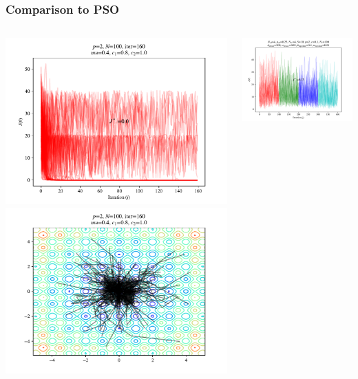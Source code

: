 \documentclass{beamer}
\begin{document}
\begin{frame}
\frametitle{Comparison to PSO}
\begin{columns}[T]
    \begin{center}
      \includegraphics[scale=0.3]{assets/pso_J}
      \includegraphics[scale=0.3]{assets/pso_theta}
    \end{center}
  \begin{center}
    \includegraphics[scale=0.3]{assets/rastrigin_colony_ed_1_J}

\end{center}
\end{columns}
\end{frame}
\end{document}
